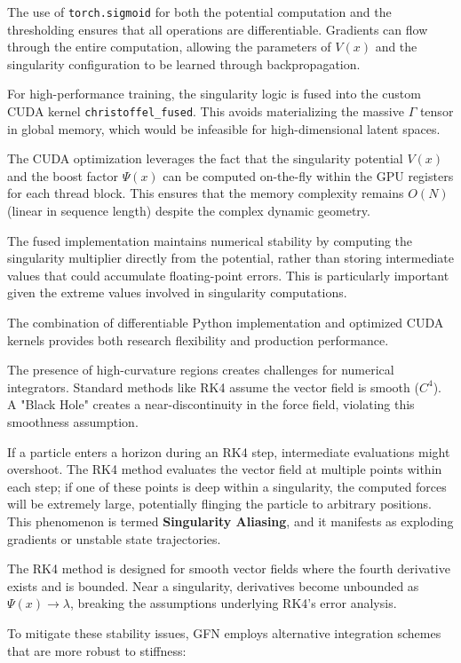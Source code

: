 \documentclass[12pt,letterpaper,twoside]{article}
\begin{document}
The use of \texttt{torch.sigmoid} for both the potential computation and the thresholding ensures that all operations are differentiable. Gradients can flow through the entire computation, allowing the parameters of $V(x)$ and the singularity configuration to be learned through backpropagation.

For high-performance training, the singularity logic is fused into the custom CUDA kernel \texttt{christoffel\_fused}. This avoids materializing the massive $\Gamma$ tensor in global memory, which would be infeasible for high-dimensional latent spaces.

The CUDA optimization leverages the fact that the singularity potential $V(x)$ and the boost factor $\Psi(x)$ can be computed on-the-fly within the GPU registers for each thread block. This ensures that the memory complexity remains $O(N)$ (linear in sequence length) despite the complex dynamic geometry.

The fused implementation maintains numerical stability by computing the singularity multiplier directly from the potential, rather than storing intermediate values that could accumulate floating-point errors. This is particularly important given the extreme values involved in singularity computations.

The combination of differentiable Python implementation and optimized CUDA kernels provides both research flexibility and production performance.

The presence of high-curvature regions creates challenges for numerical integrators. Standard methods like RK4 assume the vector field is smooth ($C^4$). A "Black Hole" creates a near-discontinuity in the force field, violating this smoothness assumption.

If a particle enters a horizon during an RK4 step, intermediate evaluations might overshoot. The RK4 method evaluates the vector field at multiple points within each step; if one of these points is deep within a singularity, the computed forces will be extremely large, potentially flinging the particle to arbitrary positions. This phenomenon is termed \textbf{Singularity Aliasing}, and it manifests as exploding gradients or unstable state trajectories.

The RK4 method is designed for smooth vector fields where the fourth derivative exists and is bounded. Near a singularity, derivatives become unbounded as $\Psi(x) \to \lambda$, breaking the assumptions underlying RK4's error analysis.

To mitigate these stability issues, GFN employs alternative integration schemes that are more robust to stiffness:
\end{document}
